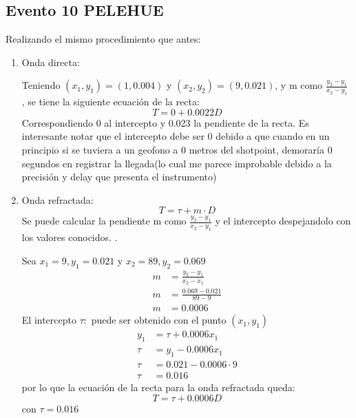 \documentclass{article}
\theoremstyle{mytheoremstyle}
\theoremstyle{mytheoremstyle}
\theoremstyle{myproblemstyle}
\begin{document}
	\subsection*{Evento 10 PELEHUE}
	Realizando el mismo procedimiento que antes:
	\begin{enumerate}
		\item Onda directa: \par 
		Teniendo $(x_1,y_1)=(1,0.004)$ y $(x_2,y_2)=(9,0.021)$, y m como $\frac{y_2-y_1}{x_2-y_1}$
		, se tiene la siguiente ecuación de la recta:
		\begin{equation*}
			T=0 + 0.0022D
			\end{equation*}
			Correspondiendo 0 al intercepto y 0.023 la pendiente de la recta. Es interesante notar que el intercepto debe ser 0 debido a que 
			cuando en un principio si se tuviera a un geofono a 0 metros del shotpoint, demoraría 0 segundos en registrar la llegada(lo cual me parece improbable debido a la precisión y delay que presenta el instrumento)
		\item Onda refractada:\begin{equation*}
			T=\tau+m\cdot D
		\end{equation*}
		Se puede calcular la pendiente m como $\frac{y_2-y_1}{x_2-y_1}$ y el intercepto despejandolo con los valores conocidos.
		.\par Sea $x_1=9,y_1=0.021$ y $x_2=89,y_2=0.069$  
		\begin{align*}
			m&=\frac{y_2-y_1}{x_2-x_1} \\
			m&=\frac{0.069-0.021}{89-9}\\ 
			m&=0.0006
		\end{align*}
		El intercepto $\tau:$ puede ser obtenido con el punto $(x_1,y_1)$
		\begin{align*}
			y_1&=\tau+0.0006x_1 \\
			\tau&=y_1-0.0006x_1 \\
			\tau&=0.021-0.0006\cdot 9 \\
			\tau&=0.016
		\end{align*}
		por lo que la ecuación de la recta para la onda refractada queda:
		\begin{equation*}
			T=\tau+0.0006D
		\end{equation*}
		con $\tau=0.016$
	\end{enumerate}
\end{document}
